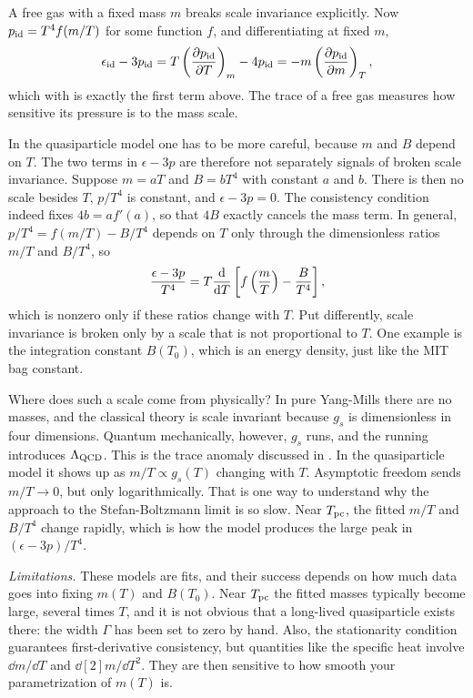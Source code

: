 A free gas with a fixed mass $m$ breaks scale invariance explicitly. Now
$p_{\rm id}=T^4f(m/T)$ for some function $f$, and differentiating at fixed $m$,
\begin{equation}
  \epsilon_{\rm id}-3p_{\rm id}=T\left(\pdv{p_{\rm id}}{T}\right)_{m}-4p_{\rm id}
   =-m\left(\pdv{p_{\rm id}}{m}\right)_{T},
\end{equation}
which with  is exactly the first term above. The trace of a
free gas measures how sensitive its pressure is to the mass scale.

In the quasiparticle model one has to be more careful, because $m$ and $B$
depend on $T$. The two terms in $\epsilon-3p$ are therefore not separately
signals of broken scale invariance. Suppose $m=aT$ and $B=bT^4$ with constant
$a$ and $b$. There is then no scale besides $T$, $p/T^4$ is constant, and
$\epsilon-3p=0$. The consistency condition  indeed
fixes $4b=af'(a)$, so that $4B$ exactly cancels the mass term.
In general, $p/T^4=f(m/T)-B/T^4$ depends on $T$ only through the
dimensionless ratios $m/T$ and $B/T^4$, so
\begin{equation}
  \frac{\epsilon-3p}{T^4}=T\dv{T}\left[f\left(\frac{m}{T}\right)
      -\frac{B}{T^4}\right],
\end{equation}
which is nonzero only if these ratios change with $T$. Put differently, scale
invariance is broken only by a scale that is not proportional to $T$. One example
is the integration constant $B(T_0)$, which is an energy density, just like the
MIT bag constant.

Where does such a scale come from physically? In pure Yang-Mills there are no
masses, and the classical theory is scale invariant because $g_s$ is
dimensionless in four dimensions. Quantum mechanically, however, $g_s$ runs,
and the running introduces $\Lambda_{\rm QCD}$. This is the trace anomaly
discussed in . In the quasiparticle model it shows up as
$m/T\propto g_s(T)$ changing with $T$. Asymptotic freedom sends $m/T\to0$, but
only logarithmically. That is one way to understand why the approach to the
Stefan-Boltzmann limit is so slow. Near $T_{\rm pc}$, the fitted $m/T$ and $B/T^4$ change
rapidly, which is how the model produces the large peak in $(\epsilon-3p)/T^4$.

{\it Limitations.} These models are fits, and their success depends on
how much data goes into fixing $m(T)$ and $B(T_0)$. Near $T_{\rm pc}$ the
fitted masses typically become large, several times $T$, and it is
not obvious that a long-lived quasiparticle exists there: the width
$\Gamma$ has been set to zero by hand. Also, the stationarity condition
 guarantees first-derivative consistency, but
quantities like the specific heat involve $\dd{m}/\dd{T}$ and
$\dd[2]{m}/\dd{T^2}$. They are then sensitive to how smooth your
parametrization of $m(T)$ is.

